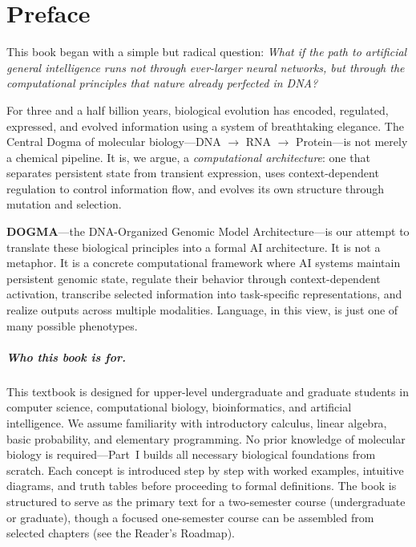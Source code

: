 \documentclass[11pt,openany]{book}
\begin{document}
\clearpage
\frontmatter
\hypersetup{pageanchor=true}

\chapter*{Preface}

This book began with a simple but radical question: \emph{What if the path to artificial general intelligence runs not through ever-larger neural networks, but through the computational principles that nature already perfected in DNA?}

For three and a half billion years, biological evolution has encoded, regulated, expressed, and evolved information using a system of breathtaking elegance. The Central Dogma of molecular biology---DNA $\to$ RNA $\to$ Protein---is not merely a chemical pipeline. It is, we argue, a \emph{computational architecture}: one that separates persistent state from transient expression, uses context-dependent regulation to control information flow, and evolves its own structure through mutation and selection.

\textbf{DOGMA}---the DNA-Organized Genomic Model Architecture---is our attempt to translate these biological principles into a formal AI architecture. It is not a metaphor. It is a concrete computational framework where AI systems maintain persistent genomic state, regulate their behavior through context-dependent activation, transcribe selected information into task-specific representations, and realize outputs across multiple modalities. Language, in this view, is just one of many possible phenotypes.

\paragraph{Who this book is for.} This textbook is designed for upper-level undergraduate and graduate students in computer science, computational biology, bioinformatics, and artificial intelligence. We assume familiarity with introductory calculus, linear algebra, basic probability, and elementary programming. No prior knowledge of molecular biology is required---Part~I builds all necessary biological foundations from scratch. Each concept is introduced step by step with worked examples, intuitive diagrams, and truth tables before proceeding to formal definitions. The book is structured to serve as the primary text for a two-semester course (undergraduate or graduate), though a focused one-semester course can be assembled from selected chapters (see the Reader's Roadmap).
\end{document}
